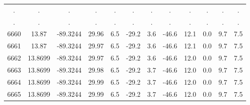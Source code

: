 \begin{table}
\begin{tabular}{cccccccccccc}
             . &                      . &                          . &                      . &                      . &                . &                . &               . &                . &                       . &                 . &              . \\
             . &                      . &                          . &                      . &                      . &                . &                . &               . &                . &                       . &                 . &              . \\
          6660 &                  13.87 &                   -89.3244 &                  29.96 &                    6.5 &            -29.2 &              3.6 &           -46.6 &             12.1 &                     0.0 &               9.7 &            7.5 \\
          6661 &                  13.87 &                   -89.3244 &                  29.97 &                    6.5 &            -29.2 &              3.6 &           -46.6 &             12.1 &                     0.0 &               9.7 &            7.5 \\
          6662 &                13.8699 &                   -89.3244 &                  29.97 &                    6.5 &            -29.2 &              3.6 &           -46.6 &             12.0 &                     0.0 &               9.7 &            7.5 \\
          6663 &                13.8699 &                   -89.3244 &                  29.98 &                    6.5 &            -29.2 &              3.7 &           -46.6 &             12.0 &                     0.0 &               9.7 &            7.5 \\
          6664 &                13.8699 &                   -89.3244 &                  29.99 &                    6.5 &            -29.2 &              3.7 &           -46.6 &             12.0 &                     0.0 &               9.7 &            7.5 \\
          6665 &                13.8699 &                   -89.3244 &                  29.99 &                    6.5 &            -29.2 &              3.7 &           -46.6 &             12.0 &                     0.0 &               9.7 &            7.5 \\
\bottomrule
\end{tabular}
\end{table}
